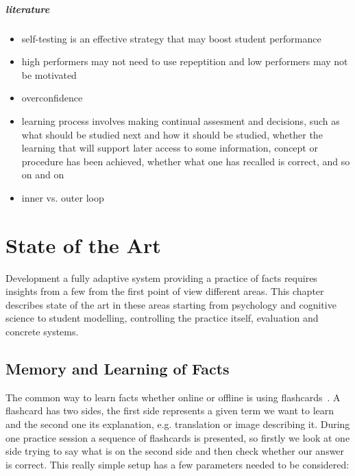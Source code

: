 \documentclass[table,color]{fithesis3/fithesis3}
\begin{document}
\paragraph{literature}

\begin{itemize}
	\item self-testing is an effective strategy that may boost student
		performance~\cite{bjork2013self}
	\item high performers may not need to use repeptition and low performers may
		not be motivated~\cite{bjork2013self}
	\item overconfidence~\cite{bjork2013self, kornell2008optimising}
	\item learning process involves making continual assesment and decisions, such
	as what should be studied next and how it should be studied, whether the
	learning that will support later access to some information, concept or
	procedure has been achieved, whether what one has recalled is correct, and so
	on and on~\cite{bjork2013self}
	\item inner vs. outer loop~\cite{koedinger2013new}
\end{itemize}

\chapter{State of the Art}

Development a fully adaptive system providing a practice of facts requires
insights from a few from the first point of view different areas. This chapter
describes state of the art in these areas starting from psychology and
cognitive science to student modelling, controlling the practice itself,
evaluation and concrete systems.

\section{Memory and Learning of Facts}

The common way to learn facts whether online or offline is using
flashcards~\cite{kornell2008optimising}. A flashcard has two sides, the first
side represents a given term we want to learn and the second one its
explanation, e.g. translation or image describing it.  During one practice
session a sequence of flashcards is presented, so firstly we look at one side
trying to say what is on the second side and then check whether our answer is
correct. This really simple setup has a few parameters needed to be considered:
\end{document}
